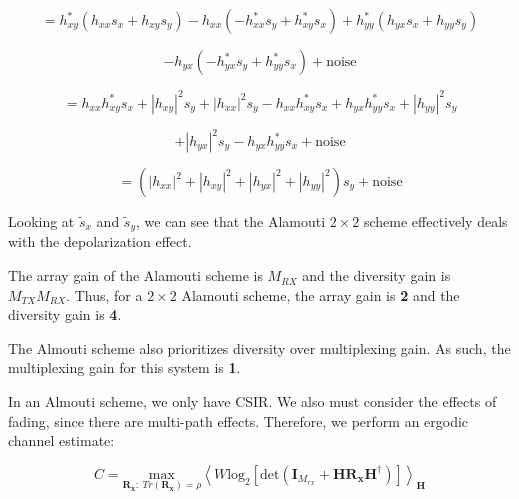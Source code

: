 \documentclass[fleqn]{article}
\begin{document}
\begin{enumerate}
		\begin{equation*}
			= h_{xy}^*(h_{xx}s_x + h_{xy}s_y) - h_{xx}(-h_{xx}^*s_y + h_{xy}^*s_x) + h_{yy}^*(h_{yx}s_x + h_{yy}s_y)
		\end{equation*}
		
		\begin{equation*}
			- h_{yx}(-h_{yx}^*s_y + h_{yy}^*s_x) + \text{noise}
		\end{equation*}
		
		\begin{equation*}
			= h_{xx}h_{xy}^*s_x + |h_{xy}|^2s_y + |h_{xx}|^2s_y - h_{xx}h_{xy}^*s_x + h_{yx}h_{yy}^*s_x + |h_{yy}|^2s_y
		\end{equation*}
		
		\begin{equation*}
			+ |h_{yx}|^2s_y - h_{yx}h_{yy}^*s_x + \text{noise}
		\end{equation*}
		
		\begin{equation*}
			= (|h_{xx}|^2 + |h_{xy}|^2 + |h_{yx}|^2 + |h_{yy}|^2)s_y + \text{noise}
		\end{equation*}
		
		Looking at $\tilde{s}_x$ and $\tilde{s}_y$, we can see that the Alamouti $2\times 2$ scheme effectively deals with the depolarization effect.
		
		\pagebreak
		
%		
%		
		
		The array gain of the Alamouti scheme is $M_{RX}$ and the diversity gain is $M_{TX}M_{RX}$. Thus, for a $2 \times 2$ Alamouti scheme, the array gain is \textbf{2} and the diversity gain is \textbf{4}.

		The Almouti scheme also prioritizes diversity over multiplexing gain. As such, the multiplexing gain for this system is \textbf{1}.
		
		In an Almouti scheme, we only have CSIR. We also must consider the effects of fading, since there are multi-path effects. Therefore, we perform an ergodic channel estimate:
		
		\begin{equation*}
			C = \underset{\mathbf{R_x}:\ Tr(\mathbf{R_x}) = \rho}{\text{max}}\left\langle W \text{log}_2[\text{det}(\mathbf{I}_{M_{rx}} + \mathbf{HR_xH^{\dagger}})]\right\rangle_{\mathbf{H}}
		\end{equation*}
		

\end{enumerate}
\end{document}
